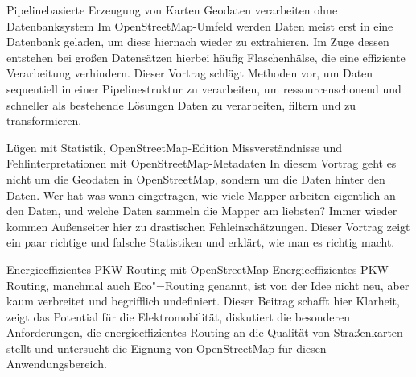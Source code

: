 %
{Pipelinebasierte Erzeugung von Karten}%
{Geodaten verarbeiten ohne Datenbanksystem}%
{%
Im OpenStreetMap-Umfeld werden Daten meist erst in eine Datenbank geladen, um diese hiernach wieder zu
extrahieren. Im Zuge dessen entstehen bei großen Datensätzen hierbei häufig Flaschenhälse, die eine
effiziente Verarbeitung verhindern. Dieser Vortrag schlägt Methoden vor, um Daten sequentiell in
einer Pipelinestruktur zu verarbeiten, um ressourcenschonend und schneller als bestehende Lösungen
Daten zu verarbeiten, filtern und zu transformieren.%
}


%
{Lügen mit Statistik, OpenStreetMap-Edition\vspace{0.2em}}%
{Missverständnisse und Fehlinterpretationen mit OpenStreetMap-Metadaten}%
{%
In diesem Vortrag geht es nicht um die Geodaten in OpenStreetMap, sondern um die Daten hinter den
Daten. Wer hat was wann eingetragen, wie viele Mapper arbeiten eigentlich an den Daten, und welche
Daten sammeln die Mapper am liebsten? Immer wieder kommen Außenseiter hier zu drastischen
Fehleinschätzungen. Dieser Vortrag zeigt ein paar richtige und falsche Statistiken und erklärt, wie
man es richtig macht.%
}

%
{Energieeffizientes PKW-Routing mit OpenStreetMap}%
{}%
{%
Energieeffizientes PKW-Routing, manchmal auch Eco"=Routing genannt, ist von der Idee nicht neu, aber
kaum verbreitet und begrifflich undefiniert. Dieser Beitrag schafft hier Klarheit, zeigt das
Potential für die Elektromobilität, diskutiert die besonderen Anforderungen, die energieeffizientes
Routing an die Qualität von Straßenkarten stellt und untersucht die Eignung von OpenStreetMap für
diesen Anwendungsbereich.%
}

